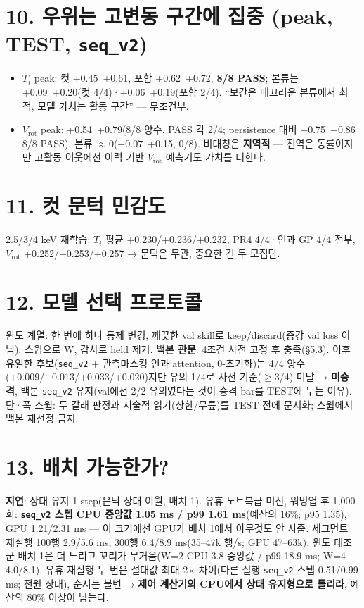 \documentclass[10pt,a4paper]{article}
\newcommand{\Ti}{\ensuremath{T_i}}
\newcommand{\Vrot}{\ensuremath{V_\mathrm{rot}}}
\newcommand{\seqv}{\texttt{seq\_v2}}
\begin{document}
\section*{10. 우위는 고변동 구간에 집중 (peak, TEST, \seqv)}
\begin{itemize}
\item \Ti{} peak: 컷 +0.45~+0.61, 포함 +0.62~+0.72, \textbf{8/8 PASS}; 본류는 +0.09~+0.20(컷 4/4)·+0.06~+0.19(포함 2/4). ``보간은 매끄러운 본류에서 최적, 모델 가치는 활동 구간'' — 무조건부.
\item \Vrot{} peak: +0.54~+0.79(8/8 양수, PASS 각 2/4; persistence 대비 +0.75~+0.86 8/8 PASS), 본류 $\approx$0($-0.07$~+0.15, 0/8). 비대칭은 \textbf{지역적} — 전역은 동률이지만 고활동 이웃에선 이력 기반 \Vrot{} 예측기도 가치를 더한다.
\end{itemize}

\section*{11. 컷 문턱 민감도}
2.5/3/4 keV 재학습: \Ti{} 평균 +0.230/+0.236/+0.232, PR4 4/4·인과 GP 4/4 전부, \Vrot{} +0.252/+0.253/+0.257 → 문턱은 무관, 중요한 건 두 모집단.

\section*{12. 모델 선택 프로토콜}
윈도 계열: 한 번에 하나 통제 변경, 깨끗한 val skill로 keep/discard(증강 val loss 아님), 스윕으로 W, 감사로 held 제거. \textbf{백본 관문}: 4조건 사전 고정 후 충족(\S5.3). 이후 유일한 후보(\seqv{} + 관측마스킹 인과 attention, 0-초기화)는 4/4 양수(+0.009/+0.013/+0.033/+0.020)지만 유의 1/4로 사전 기준($\geq$3/4) 미달 → \textbf{미승격}, 백본 \seqv{} 유지(val에선 2/2 유의였다는 것이 승격 bar를 TEST에 두는 이유). 단·폭 스윕: 두 갈래 판정과 서술적 읽기(상한/무릎)를 TEST 전에 문서화; 스윕에서 백본 재선정 금지.

\section*{13. 배치 가능한가?}
\textbf{지연}: 상태 유지 1-step(은닉 상태 이월, 배치 1). 유휴 노트북급 머신, 워밍업 후 1,000회: \textbf{\seqv{} 스텝 CPU 중앙값 1.05 ms / p99 1.61 ms}(예산의 16\%; p95 1.35), GPU 1.21/2.31 ms — 이 크기에선 GPU가 배치 1에서 아무것도 안 사줌. 세그먼트 재실행 100행 2.9/5.6 ms, 300행 6.4/8.9 ms(35–47k 행/s; GPU 47–63k). 윈도 대조군 배치 1은 더 느리고 꼬리가 무거움(W=2 CPU 3.8 중앙값 / p99 18.9 ms; W=4 4.0/8.1). 유휴 재실행 두 번은 절대값 최대 2$\times$ 차이(다른 실행 \seqv{} 스텝 0.51/0.99 ms; 전원 상태), 순서는 불변 → \textbf{제어 계산기의 CPU에서 상태 유지형으로 돌리라}, 예산의 80\% 이상이 남는다.
\end{document}
